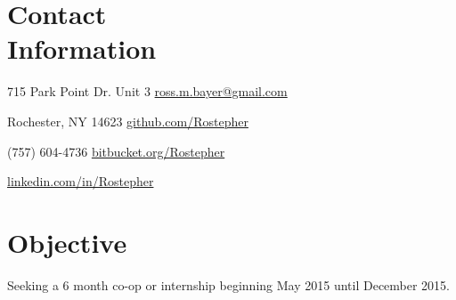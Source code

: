 \documentclass[a4paper,margin,line]{resume}
\begin{document}
\vspace{10mm}
\begin{resume}

\section{\mysidestyle Contact \\ Information}
	\begin{asparablank}
		\item 715 Park Point Dr. Unit 3 \hfill \href{mailto:ross.m.bayer@gmail.com}{ross.m.bayer@gmail.com}
		\item Rochester, NY 14623 \hfill \href{https://github.com/Rostepher}{github.com/Rostepher}
		\item (757) 604-4736 \hfill \href{https://bitbucket.org/Rostepher}{bitbucket.org/Rostepher}
        \item \hfill \href{https://linkedin.com/in/Rostepher}{linkedin.com/in/Rostepher}
	\end{asparablank}

\section{\mysidestyle Objective}
	\begin{asparablank}
    	\item Seeking a 6 month co-op or internship beginning May 2015 until December 2015.
	\end{asparablank}


\end{resume}
\end{document}
